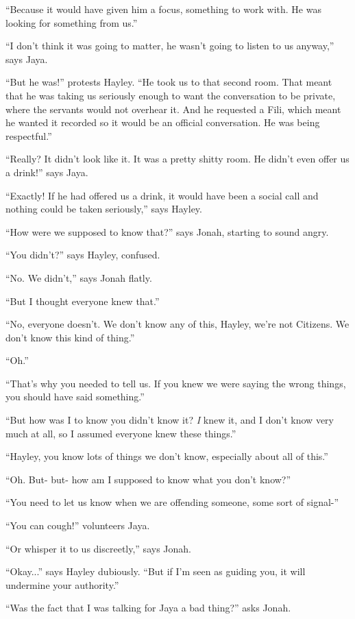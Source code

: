 ``Because it would have given him a focus, something to work with. He was looking for something from us.''

``I don't think it was going to matter, he wasn't going to listen to us anyway,'' says Jaya.

``But he was!'' protests Hayley.  ``He took us to that second room.  That meant that he was taking us seriously enough to want the conversation to be private, where the servants would not overhear it.  And he requested a Fili, which meant he wanted it recorded so it would be an official conversation.  He was being respectful.''

``Really?  It didn't look like it.  It was a pretty shitty room.  He didn't even offer us a drink!'' says Jaya.

``Exactly!  If he had offered us a drink, it would have been a social call and nothing could be taken seriously,'' says Hayley.

``How were we supposed to know that?'' says Jonah, starting to sound angry.

``You didn't?'' says Hayley, confused.

``No.  We didn't,'' says Jonah flatly.

``But I thought everyone knew that.''

``No, everyone doesn't.  We don't know any of this, Hayley, we're not Citizens.  We don't know this kind of thing.''

``Oh.''

``That's why you needed to tell us.  If you knew we were saying the wrong things, you should have said something.''

``But how was I to know you didn't know it?  \textit{I} knew it, and I don't know very much at all, so I assumed everyone knew these things.''

``Hayley, you know lots of things we don't know, especially about all of this.''

``Oh.  But- but- how am I supposed to know what you don't know?''

``You need to let us know when we are offending someone, some sort of signal-''

``You can cough!'' volunteers Jaya.

``Or whisper it to us discreetly,'' says Jonah.

``Okay...'' says Hayley dubiously. ``But if I'm seen as guiding you, it will undermine your authority.''

``Was the fact that I was talking for Jaya a bad thing?'' asks Jonah.

